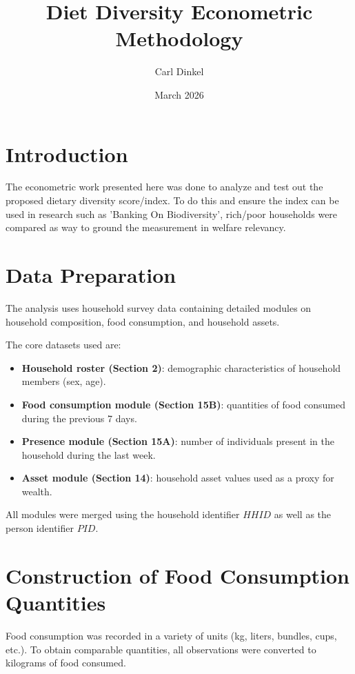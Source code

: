 \documentclass{article}
\title{Diet Diversity Econometric Methodology}
\author{Carl Dinkel}
\date{March 2026}
\begin{document}
\maketitle

\section{Introduction}

The econometric work presented here was done to analyze and test out the proposed dietary diversity score/index. To do this and ensure the index can be used in research such as 'Banking On Biodiversity', rich/poor households were compared as way to ground the measurement in welfare relevancy. 

\section{Data Preparation}

The analysis uses household survey data containing detailed modules on household composition, food consumption, and household assets.

The core datasets used are:

\begin{itemize}
\item \textbf{Household roster (Section 2)}: demographic characteristics of household members (sex, age).
\item \textbf{Food consumption module (Section 15B)}: quantities of food consumed during the previous 7 days.
\item \textbf{Presence module (Section 15A)}: number of individuals present in the household during the last week.
\item \textbf{Asset module (Section 14)}: household asset values used as a proxy for wealth.
\end{itemize}

All modules were merged using the household identifier $HHID$ as well as the person identifier $PID$.

\section{Construction of Food Consumption Quantities}

Food consumption was recorded in a variety of units (kg, liters, bundles, cups, etc.). To obtain comparable quantities, all observations were converted to kilograms of food consumed.
\end{document}
